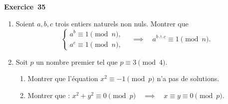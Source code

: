 \documentclass[11pt,a4paper]{article}
\begin{document}
	\medskip\noindent\textbf{\Large\color{bleu}Exercice~35}\nopagebreak
	\begin{enonce}
		\begin{enumerate}
			\item Soient $a, b, c$ trois entiers naturels non nuls. Montrer que
			\[
			\begin{cases}
				a^b \equiv 1 \pmod n, \\
				a^c \equiv 1 \pmod n,
			\end{cases}
			\quad \implies \quad
			a^{b \wedge c} \equiv 1 \pmod n.
			\]
			
			\item Soit $p$ un nombre premier tel que $p \equiv 3 \pmod 4$.
			\begin{enumerate}
				\item[(a)] Montrer que l'équation $x^2 \equiv -1 \pmod p$ n'a pas de solutions.
				\item[(b)] Montrer que : $x^2 + y^2 \equiv 0 \pmod p \quad \implies \quad x \equiv y \equiv 0 \pmod p$.
			\end{enumerate}
		\end{enumerate}
	\end{enonce}
\end{document}
